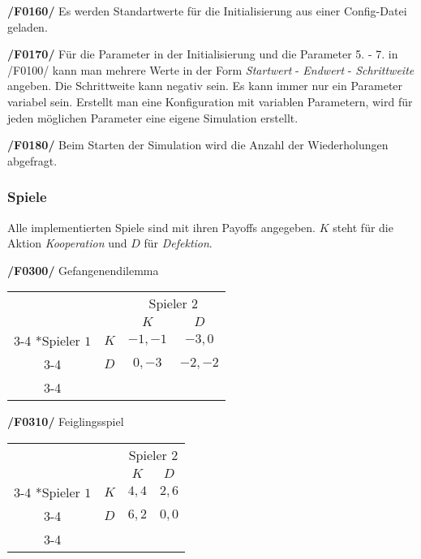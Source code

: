 \textbf{/F0160/} 
Es werden Standartwerte für die Initialisierung aus einer Config-Datei geladen.

\textbf{/F0170/} 
Für die Parameter in der Initialisierung und die Parameter 5. - 7. in /F0100/ kann man mehrere Werte in der Form \emph{Startwert} - \emph{Endwert} - \emph{Schrittweite} angeben. Die Schrittweite kann negativ sein. Es kann immer nur ein Parameter variabel sein. Erstellt man eine Konfiguration mit variablen Parametern, wird für jeden möglichen Parameter eine eigene Simulation erstellt.

\textbf{/F0180/}
Beim Starten der Simulation wird die Anzahl der Wiederholungen abgefragt.

\subsubsection{Spiele}
Alle implementierten Spiele sind mit ihren Payoffs angegeben. $K$ steht für die Aktion \emph{Kooperation} und $D$ für \emph{Defektion}.

\textbf{/F0300/} 
Gefangenendilemma
\begin{table}[H]
\centering
\setlength{\extrarowheight}{2pt}
\begin{tabular}{cc|c|c|}
  & \multicolumn{1}{c}{} & \multicolumn{2}{c}{Spieler $2$} \\
  & \multicolumn{1}{c}{} & \multicolumn{1}{c}{$K$} & \multicolumn{1}{c}{$D$} \\\cline{3-4}
  \multirow{2}*{Spieler $1$} & $K$ & $-1,-1$ & $-3,0$ \\\cline{3-4} 
  & $D$ & $0,-3$ & $-2,-2$ \\\cline{3-4}
\end{tabular}
\end{table}

\textbf{/F0310/} 
Feiglingsspiel
\begin{table}[H]
\centering
\setlength{\extrarowheight}{2pt}
\begin{tabular}{cc|c|c|}
  & \multicolumn{1}{c}{} & \multicolumn{2}{c}{Spieler $2$} \\
  & \multicolumn{1}{c}{} & \multicolumn{1}{c}{$K$} & \multicolumn{1}{c}{$D$} \\\cline{3-4}
  \multirow{2}*{Spieler $1$} & $K$ & $4,4$ & $2,6$ \\\cline{3-4} 
  & $D$ & $6,2$ & $0,0$ \\\cline{3-4}
\end{tabular}
\end{table}

